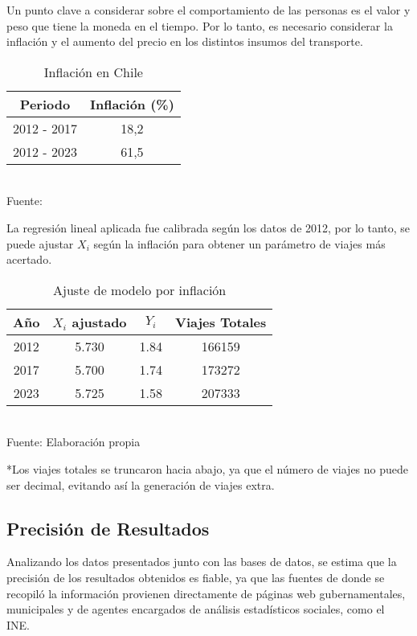 \documentclass[12pt]{article} %
\begin{document}
Un punto clave a considerar sobre el comportamiento de las personas es el valor y peso que tiene la moneda en el tiempo. Por lo tanto, es necesario considerar la inflación y el aumento del precio en los distintos insumos del transporte.

\begin{table}[H]
    \centering
    \caption{Inflación en Chile}
    \vspace{0.2cm}
    \begin{tabular}{|c|c|}
        \hline
        Periodo & Inflación (\%) \\
        \hline
        2012 - 2017 & 18,2 \\
        2012 - 2023 & 61,5 \\
        \hline
    \end{tabular}
    \vspace{0.2cm}
    \\Fuente: \textbf{\cite{ipc}}
\end{table}

La regresión lineal aplicada fue calibrada según los datos de 2012, por lo tanto, se puede ajustar $X_i$ según la inflación para obtener un parámetro de viajes más acertado.

\begin{table}[H]
    \centering
    \caption{Ajuste de modelo por inflación}
    \vspace{0.2cm}
    \begin{tabular}{|c|c|c|c|}
        \hline
        Año & $X_i$ ajustado & $Y_i$ & Viajes Totales \\
        \hline
        2012 & 5.730 & 1.84 & 166159 \\
        2017 & 5.700 & 1.74 & 173272 \\
        2023 & 5.725 & 1.58 & 207333 \\
        \hline
    \end{tabular}
    \vspace{0.2cm}
    \\Fuente: Elaboración propia
\end{table}

*Los viajes totales se truncaron hacia abajo, ya que el número de viajes no puede ser decimal, evitando así la generación de viajes extra.

\subsection{Precisión de Resultados}

Analizando los datos presentados junto con las bases de datos, se estima que la precisión de los resultados obtenidos es fiable, ya que las fuentes de donde se recopiló la información provienen directamente de páginas web gubernamentales, municipales y de agentes encargados de análisis estadísticos sociales, como el INE.
\end{document}
